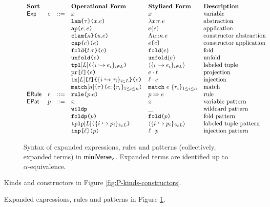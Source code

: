 \begin{figure}[p] 
$\begin{array}{lllllll}
\textbf{Sort} & & & \textbf{Operational Form} & \textbf{Stylized Form} & \textbf{Description}\\
\mathsf{Exp} & e & ::= & x & x & \text{variable}\\
&&& \aelam{\tau}{x}{e} & \lam{x}{\tau}{e} & \text{abstraction}\\
&&& \aeap{e}{e} & \ap{e}{e} & \text{application}\\
&&& \aeclam{\kappa}{u}{e} & \clam{u}{\kappa}{e} & \text{constructor abstraction}\\
&&& \aecap{e}{c} & \cAp{e}{c} & \text{constructor application}\\
&&& \aefold{t}{\tau}{e} & \fold{e} & \text{fold}\\
&&& \aeunfold{e} & \unfold{e} & \text{unfold}\\
&&& \aetpl{\labelset}{\mapschema{e}{i}{\labelset}} & \tpl{\mapschema{e}{i}{\labelset}} & \text{labeled tuple}\\
&&& \aepr{\ell}{e} & \prj{e}{\ell} & \text{projection}\\
&&& \aein{\labelset}{\ell}{\mapschema{\tau}{i}{\labelset}}{e} & \inj{\ell}{e} & \text{injection}\\
&&& \aematchwith{n}{\tau}{e}{\seqschemaX{r}} & \matchwith{e}{\seqschemaX{r}} & \text{match}\\
\mathsf{ERule} & r & ::= & \aematchrule{p}{e} & \matchrule{p}{e} & \text{rule}\\
\mathsf{EPat} & p & ::= & x & x & \text{variable pattern}\\
&&& \aewildp & \wildp & \text{wildcard pattern}\\
&&& \aefoldp{p} & \foldp{p} & \text{fold pattern}\\
&&& \aetplp{\labelset}{\mapschema{p}{i}{\labelset}} & \tplp{\mapschema{p}{i}{\labelset}} & \text{labeled tuple pattern}\\
&&& \aeinjp{\ell}{p} & \injp{\ell}{p} & \text{injection pattern}
\end{array}$
\caption[Syntax of expanded expressions, rules and patterns in $\miniVerseParam$]{Syntax of expanded expressions, rules and patterns (collectively, expanded terms) in $\miniVerseParam$. Expanded terms are identified up to $\alpha$-equivalence.}
\label{fig:P-expanded-terms}
\end{figure}
Kinds and constructors in Figure \ref{fig:P-kinds-constructors}.

Expanded expressions, rules and patterns in Figure \ref{fig:P-expanded-terms}.

